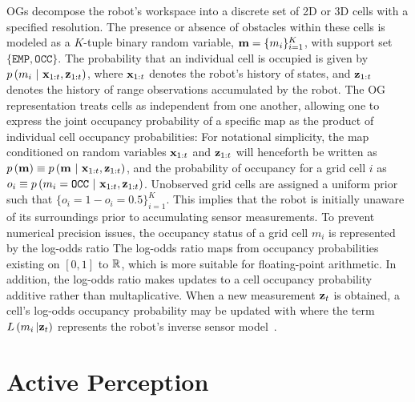 OGs decompose the robot's workspace into a discrete set of 2D or 3D cells with a
specified resolution. The presence or absence of obstacles within these cells is modeled
as a $K$-tuple binary random variable, $\mathbf{m} = \{m_{i}\}_{i=1}^{K}$, with support set
$\{\texttt{EMP}, \texttt{OCC}\}$. The probability that an individual cell is occupied is
given by $p\left(m_{i} \ \vert \ \mathbf{x}_{1:t}, \mathbf{z}_{1:t}\right)$, where $\mathbf{x}_{1:t}$ denotes the
robot's history of states, and $\mathbf{z}_{1:t}$ denotes the history of range observations
accumulated by the robot. The OG representation treats cells as independent from one another,
allowing one to express the joint occupancy probability of a specific map as the product of individual
cell occupancy probabilities:
%
%
For notational simplicity, the map conditioned on random variables
$\mathbf{x}_{1:t}$ and $\mathbf{z}_{1:t}$ will henceforth be written as $p\left(\mathbf{m}\right)
\equiv p\left(\mathbf{m} \ \vert \ \mathbf{x}_{1:t}, \mathbf{z}_{1:t}\right)$, and the probability of occupancy
for a grid cell $i$ as $o_{i}\equiv p\left(m_{i}=\texttt{OCC}\ \vert \
\mbf{x}_{1:t}, \mbf{z}_{1:t}\right)$.
Unobserved grid cells are assigned a uniform prior such that
$\{o_{i} = 1 - o_{i} = 0.5\}_{i=1}^{K}$. This implies that the robot is
initially unaware of its surroundings prior to accumulating sensor measurements.
To prevent numerical precision issues, the
occupancy status of a grid cell $m_i$ is represented by the log-odds ratio
%
%
The log-odds ratio maps from occupancy probabilities existing on $[0, 1]$ to
${\mathbb{R}}$, which is more suitable for floating-point arithmetic. In addition,
the log-odds ratio makes updates to a cell occupancy probability additive rather
than multaplicative. When a new measurement $\mathbf{z}_t$ is obtained, a cell's
log-odds  occupancy probability
may be updated with
%
%
where the term $L\left(m_{i}\,  \vert \mathbf{z}_{t}\right)$ represents the robot's inverse sensor model~\cite{thrun2005probabilistic}.

\section{Active Perception}
\label{sec:active_perception}

